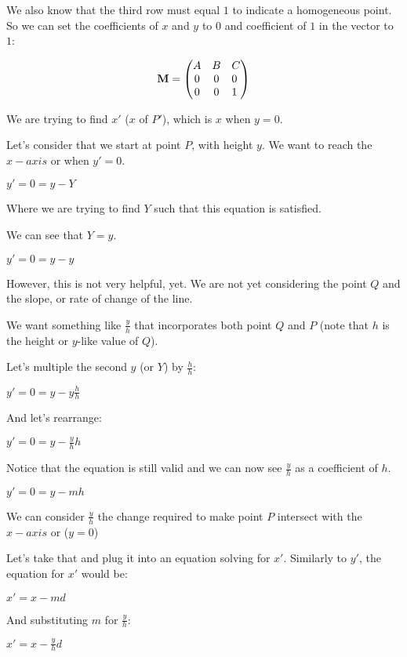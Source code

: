 \documentclass[12pt]{article}
\begin{document}
We also know that the third row must equal $1$ to indicate a homogeneous point.
So we can set the coefficients of $x$ and $y$ to $0$ and coefficient of $1$ in the vector to $1$:

\begin{align}
\textbf{M} &=
\begin{pmatrix}
A \hfill & B & C \\
0 & 0 & 0 \hfill \\
0 & 0 & 1 \hfill 
\end{pmatrix} \nonumber \\
\end{align}

We are trying to find $x'$ ($x$ of $P'$), which is $x$ when $y = 0$.

Let's consider that we start at point $P$, with height $y$. 
We want to reach the $x-axis$ or when $y' = 0$.

$y' = 0 = y - Y$

Where we are trying to find $Y$ such that this equation is satisfied.

We can see that $Y = y$.

$y' = 0 = y - y$

However, this is not very helpful, yet.
We are not yet considering the point $Q$ and the slope, 
or rate of change of the line.

We want something like ${\frac{y}{h}}$ that incorporates both point $Q$ and $P$
(note that $h$ is the height or $y$-like value of $Q$).

Let's multiple the second $y$ (or $Y$) by ${\frac{h}{h}}$:

$y' = 0 = y - y {\frac{h}{h}}$

And let's rearrange:

$y' = 0 = y - {\frac{y}{h}} h$

Notice that the equation is still valid and we can now see ${\frac{y}{h}}$ as a coefficient of $h$.

$y' = 0 = y - m h$

We can consider ${\frac{y}{h}}$ the change required to make 
point $P$ intersect with the $x-axis$ or ($y = 0$)

Let's take that and plug it into an equation solving for $x'$.
Similarly to $y'$, the equation for $x'$ would be:

$x' = x - m d$

And substituting $m$ for ${\frac{y}{h}}$:

$x' = x - {\frac{y}{h}} d$
\end{document}
